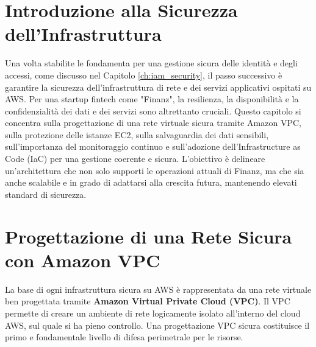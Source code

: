 \section{Introduzione alla Sicurezza dell'Infrastruttura}
Una volta stabilite le fondamenta per una gestione sicura delle identità e degli accessi, come discusso nel Capitolo \ref{ch:iam_security}, il passo successivo è garantire la sicurezza dell'infrastruttura di rete e dei servizi applicativi ospitati su AWS. Per una startup fintech come "Finanz", la resilienza, la disponibilità e la confidenzialità dei dati e dei servizi sono altrettanto cruciali. Questo capitolo si concentra sulla progettazione di una rete virtuale sicura tramite Amazon VPC, sulla protezione delle istanze EC2, sulla salvaguardia dei dati sensibili, sull'importanza del monitoraggio continuo e sull'adozione dell'Infrastructure as Code (IaC) per una gestione coerente e sicura. L'obiettivo è delineare un'architettura che non solo supporti le operazioni attuali di Finanz, ma che sia anche scalabile e in grado di adattarsi alla crescita futura, mantenendo elevati standard di sicurezza.

\section{Progettazione di una Rete Sicura con Amazon VPC}
\label{sec:vpc-design_cap2}
La base di ogni infrastruttura sicura su AWS è rappresentata da una rete virtuale ben progettata tramite \textbf{Amazon Virtual Private Cloud (VPC)}. Il VPC permette di creare un ambiente di rete logicamente isolato all'interno del cloud AWS, sul quale si ha pieno controllo. Una progettazione VPC sicura costituisce il primo e fondamentale livello di difesa perimetrale per le risorse.

